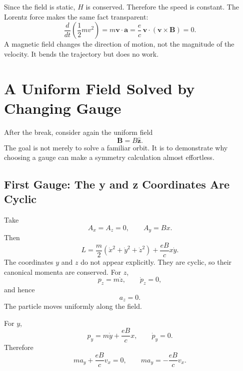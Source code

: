Since the field is static, \(H\) is conserved. Therefore the speed is constant. The Lorentz force makes the same fact transparent:
\begin{equation}
  \frac{d}{dt}\left(\frac12mv^2\right)
  =
  m\mathbf v\cdot\mathbf a
  =
  \frac{e}{c}\,
  \mathbf v\cdot(\mathbf v\times\mathbf B)
  =0.
\end{equation}
A magnetic field changes the direction of motion, not the magnitude of the velocity. It bends the trajectory but does no work.

\section{A Uniform Field Solved by Changing Gauge}

After the break, consider again the uniform field
\begin{equation}
  \mathbf B=B\hat{\mathbf z}.
\end{equation}
The goal is not merely to solve a familiar orbit. It is to demonstrate why choosing a gauge can make a symmetry calculation almost effortless.

\subsection{First Gauge: The y and z Coordinates Are Cyclic}

Take
\begin{equation}
  A_x=A_z=0,
  \qquad
  A_y=Bx.
\end{equation}
Then
\begin{equation}
  L
  =
  \frac{m}{2}
  \left(\dot x^2+\dot y^2+\dot z^2\right)
  +
  \frac{eB}{c}x\dot y.
\end{equation}
The coordinates \(y\) and \(z\) do not appear explicitly. They are cyclic, so their canonical momenta are conserved. For \(z\),
\begin{equation}
  p_z=m\dot z,
  \qquad
  \dot p_z=0,
\end{equation}
and hence
\begin{equation}
  a_z=0.
\end{equation}
The particle moves uniformly along the field.

For \(y\),
\begin{equation}
  p_y=m\dot y+\frac{eB}{c}x,
  \qquad
  \dot p_y=0.
\end{equation}
Therefore
\begin{equation}
  m a_y+\frac{eB}{c}v_x=0,
  \qquad
  \boxed{m a_y=-\frac{eB}{c}v_x}.
\end{equation}


